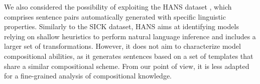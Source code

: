 We also considered the possibility of exploiting the HANS dataset \parencite{mccoy_19}, which comprises  sentence pairs automatically generated with specific linguistic properties. Similarly to the SICK dataset, HANS aims at identifying models relying on shallow heuristics to perform natural language inference and includes a larger set of transformations. However, it does not aim to characterize model compositional abilities, as it generates sentences based on a set of templates that share a similar compositional scheme. From our point of view, it is less adapted for a fine-grained analysis of compositional knowledge.





